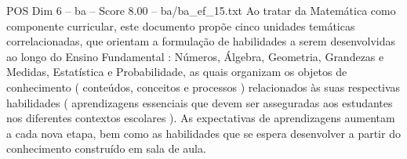 \begin{textsample}{POS Dim 6 – ba – Score 8.00 – ba/ba\_ef\_15.txt}
Ao tratar da Matemática como componente curricular, este documento propõe cinco unidades temáticas correlacionadas, que orientam a formulação de habilidades a serem desenvolvidas ao longo do Ensino Fundamental : Números, Álgebra, Geometria, Grandezas e Medidas, Estatística e Probabilidade, as quais organizam os objetos de conhecimento ( conteúdos, conceitos e processos ) relacionados às suas respectivas habilidades ( aprendizagens essenciais que devem ser asseguradas aos estudantes nos diferentes contextos escolares ).
As expectativas de aprendizagens aumentam a cada nova etapa, bem como as habilidades que se espera desenvolver a partir do conhecimento construído em sala de aula.

\end{textsample}
